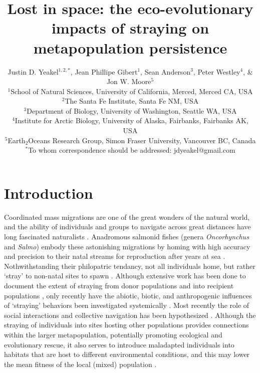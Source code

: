 \documentclass[twocolumn,preprintnumbers,amsmath,amssymb,superscriptaddress]{revtex4}
\begin{document}
\title{Lost in space: the eco-evolutionary impacts of straying on metapopulation persistence}
\author{Justin D. Yeakel${}^{1,2,*}$, Jean Phillipe Gibert${}^{1}$, Sean Anderson${}^{3}$, Peter Westley${}^{4}$, \& Jon W. Moore${}^{5}$ \\
${}^1$School of Natural Sciences, University of California, Merced, Merced CA, USA \\
${}^2$The Santa Fe Institute, Santa Fe NM, USA \\
${}^3$Department of Biology, University of Washington, Seattle WA, USA \\
${}^4$Institute for Arctic Biology, University of Alaska, Fairbanks, Fairbanks AK, USA \\
${}^5$Earth${}_2$Oceans Research Group, Simon Fraser University, Vancouver BC, Canada \\
${}^*$To whom correspondence should be addressed: jdyeakel@gmail.com
}



\maketitle



\section{Introduction}


Coordinated mass migrations are one of the great wonders of the natural world, and the ability of individuals and groups to navigate across great distances have long fascinated naturalists \cite{MilnerGulland:2011vm}.
Anadromous salmonid fishes (genera \emph{Oncorhynchus} and \emph{Salmo}) embody these astonishing migrations by homing with high accuracy and precision to their natal streams for reproduction after years at sea \cite{Quinn:2011tf,Jonsson:2011kg,Keefer:2014gg}.
Nothwithstanding their philopatric tendancy, not all individuals home, but rather `stray' to non-natal sites to spawn \cite{Quinn:1993ge,Hendry:2004wf,H:2013fs}.
Although extensive work has been done to document the extent of straying from donor populations and into recipient populations \cite{Keefer:2014gg,Bett:2017ha}, only recently have the abiotic, biotic, and anthropogenic influences of `straying' behaviors been investigated systemically \cite{Keefer:2008bs,Westley:2015to,Bond:2016dz}.
Most recently the role of social interactions and collective navigation has been hypothesized \cite[][; this volume]{Berdahl:2015kv,Berdahl:2016dx}.
Although the straying of individuals into sites hosting other populations provides connections within the larger metapopulation, potentially promoting ecological and evolutionary rescue, it also serves to introduce maladapted individuals into habitats that are host to different environmental conditions, and this may lower the mean fitness of the local (mixed) population \cite{Muhlfeld:2014hs}.
\end{document}
